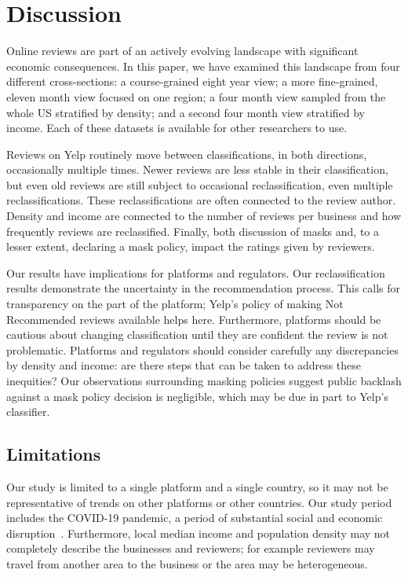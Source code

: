 \section{Discussion} \label{sec:rim:discussion}
Online reviews are part of an actively evolving landscape with significant economic consequences. In this paper, we have examined this landscape from four different cross-sections: a course-grained eight year view;
a more fine-grained, eleven month view focused on one region; a four month view sampled from the whole US stratified by density; and a second four month view stratified by income. Each of these datasets is available for other researchers to use.

Reviews on Yelp routinely move between classifications, in both directions, occasionally multiple times. Newer reviews are less stable in their classification, but even old reviews are still subject to occasional reclassification, even multiple reclassifications. These reclassifications are often connected to the review author. Density and income are connected to the number of reviews per business and how frequently reviews are reclassified. Finally, both discussion of masks and, to a lesser extent, declaring a mask policy, impact the ratings given by reviewers.

Our results have implications for platforms and regulators. Our reclassification results demonstrate the uncertainty in the recommendation process. This calls for transparency on the part of the platform; Yelp's policy of making Not Recommended reviews available helps here. Furthermore, platforms should be cautious about changing classification until they are confident the review is not problematic. 
Platforms and regulators should consider carefully any discrepancies by density and income: are there steps that can be taken to address these inequities? Our observations surrounding masking policies suggest public backlash against a mask policy decision is negligible, which may be due in part to Yelp's classifier.


\subsection{Limitations} \label{subsec:rim:limitations}

Our study is limited to a single platform and a single country, so it may not be representative of trends on other platforms or other countries. Our study period includes the COVID-19 pandemic, a period of substantial social and economic disruption~\cite{altig2020economic,deb2020economic}. Furthermore, local median income and population density may not completely describe the businesses and reviewers; for example reviewers may travel from another area to the business or the area may be heterogeneous.

